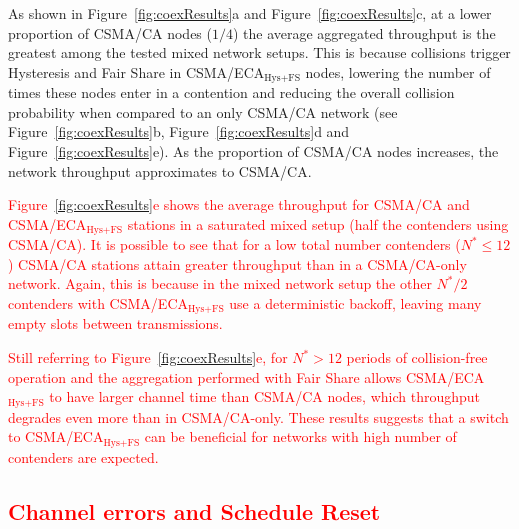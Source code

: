 	As shown in Figure~\ref{fig:coexResults}a and Figure~\ref{fig:coexResults}c, at a lower proportion of CSMA/CA nodes ($1/4$) the average aggregated throughput is the greatest among the tested mixed network setups. This is because collisions trigger Hysteresis and Fair Share in CSMA/ECA$_{\text{Hys+FS}}$ nodes, lowering the number of times these nodes enter in a contention and reducing the overall collision probability when compared to an only CSMA/CA network (see Figure~\ref{fig:coexResults}b, Figure~\ref{fig:coexResults}d and Figure~\ref{fig:coexResults}e). As the proportion of CSMA/CA nodes increases, the network throughput approximates to CSMA/CA.
	
	\textcolor{red}{Figure~\ref{fig:coexResults}e shows the average throughput for CSMA/CA and CSMA/ECA$_{\text{Hys+FS}}$ stations in a saturated mixed setup (half the contenders using CSMA/CA). It is possible to see that for a low total number contenders ($N^{*}\leq 12$) CSMA/CA stations attain greater throughput than in a CSMA/CA-only network. Again, this is because in the mixed network setup the other $N^{*}/2$ contenders with CSMA/ECA$_{\text{Hys+FS}}$ use a deterministic backoff, leaving many empty slots between transmissions.} 
	
	\textcolor{red}{Still referring to Figure~\ref{fig:coexResults}e, for $N^{*}>12$ periods of collision-free operation and the aggregation performed with Fair Share allows CSMA/ECA$_{\text{Hys+FS}}$ to have larger channel time than CSMA/CA nodes, which throughput degrades even more than in CSMA/CA-only. These results suggests that a switch to CSMA/ECA$_{\text{Hys+FS}}$ can be beneficial for networks with high number of contenders are expected.}
	
	
	
	\textcolor{red}{\subsection{Channel errors and Schedule Reset}\label{resultsSchedRest}}
	
